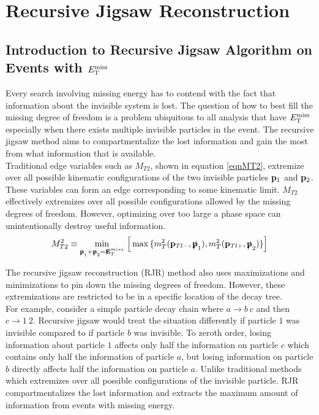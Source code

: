 \chapter{Recursive Jigsaw Reconstruction}
\label{chap:jigsaw}

\section{Introduction to Recursive Jigsaw Algorithm on Events with $E_{\mathrm{T}}^{\mathrm{miss}}$}
\label{Jigsaw:Intro}

\indent Every search involving missing energy has to contend with the fact that information about the invisible system is lost.  The question of how to best fill the missing degree of freedom is a problem ubiquitous to all analysis that have $E_{\mathrm{T}}^{\mathrm{miss}}$ especially when there exists multiple invisible particles in the event. The recursive jigsaw method aims to compartmentalize the lost information and gain the most from what information that is available.\\

\indent Traditional edge variables such as $M_{T2}$, shown in equation \ref{eqnMT2}, extremize over all possible kinematic configurations of the two invisible particles ${\bf p}_1$ and ${\bf p}_2$.  These variables can form an edge corresponding to some kinematic limit. $M_{T2}$ effectively extremizes over all possible configurations allowed by the missing degrees of freedom.  However, optimizing over too large a phase space can unintentionally destroy useful information.  \\

\begin{equation}
\label{eqnMT2}
M^{2}_{T2} \equiv \mymin[\slashed{\bf p}_{1}+\slashed{\bf p}_{2}=\slashed{\bf E}_{T}^{miss}]  \Big[ \mymax[] \{ m_{T}^{2}({\bf p}_{Tl-},\slashed{\bf p}_{1}), m_{T}^{2}({\bf p}_{Tl+},\slashed{\bf p}_{2})\} \Big]
\end{equation}

\indent The recursive jigsaw reconstruction (RJR) method also uses maximizations and minimizations to pin down the missing degrees of freedom.\cite{JigsawCompressed,JigsawContraBoost}  However, these extremizations are restricted to be in a specific location of the decay tree.  \\

\indent For example, consider a simple particle decay chain where $a \rightarrow b~c$ and then $c \rightarrow 1~2$.  Recursive jigsaw would treat the situation differently if particle $1$ was invisible compared to if particle $b$ was invisible.  To zeroth order, losing information about particle $1$ affects only half the information on particle $c$ which contains only half the information of particle $a$, but losing information on particle $b$ directly affects half the information on particle $a$.   Unlike traditional methods which extremizes over all possible configurations of the invisible particle. RJR compartmentalizes the lost information and extracts the maximum amount of information from events with missing energy.  \\


